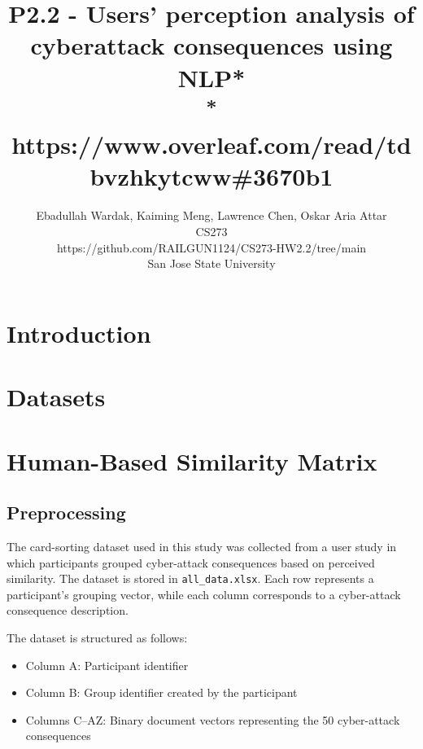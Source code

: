 \documentclass[conference]{IEEEtran}
\begin{document}
\title{P2.2 - Users' perception analysis of cyberattack consequences using NLP*\\ 

\footnotesize \textsuperscript{*} https://www.overleaf.com/read/tdbvzhkytcww\#3670b1}

\author{%
Ebadullah Wardak, Kaiming Meng, Lawrence Chen, Oskar Aria Attar\\
CS273\\
https://github.com/RAILGUN1124/CS273-HW2.2/tree/main \\ 
San Jose State University
}

\maketitle

\begin{abstract}

\end{abstract}


\section{Introduction}

\cite{abri2021explainableusers}
\section{Datasets}






\section{Human-Based Similarity Matrix}

\subsection{Preprocessing}

The card-sorting dataset used in this study was collected from a user study in which participants grouped cyber-attack consequences based on perceived similarity. The dataset is stored in \texttt{all\_data.xlsx}. Each row represents a participant's grouping vector, while each column corresponds to a cyber-attack consequence description.

The dataset is structured as follows:

\begin{itemize}
\item Column A: Participant identifier
\item Column B: Group identifier created by the participant
\item Columns C--AZ: Binary document vectors representing the 50 cyber-attack consequences
\end{itemize}
\end{document}
